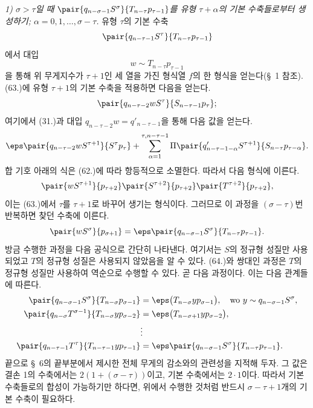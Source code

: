 
\emph{1) $\sigma>\tau$일 때 $\pair{q_{n-\sigma-1}S^\sigma}{T_{n-\tau}p_{\tau-1}}$를 유형 $\tau+\alpha$의 기본 수축들로부터 생성하기; $\alpha=0,1,\ldots,\sigma-\tau$.} 유형 $\tau$의 기본 수축
\[
 \pair{q_{n-\tau-1}S^\tau}{T_{n-\tau}p_{\tau-1}}
\]
에서 대입
\[
 w\sim T_{n-\tau}p_{\tau-1}
\]
을 통해 위 무게지수가 $\tau+1$인 세 열을 가진 형식열 $f$의 한 형식을 얻는다(\S\ 1 참조).
(63.)에 유형 $\tau+1$의 기본 수축을 적용하면 다음을 얻는다.
\[
 \pair{q_{n-\tau-2}wS^\tau}{S_{n-\tau-1}p_\tau};
\]
여기에서 (31.)과 대입 $q_{n-\tau-2}w=q'_{n-\tau-1}$을 통해 다음 값을 얻는다.
\[
 \eps\pair{q_{n-\tau-2}wS^{\tau+1}}{S^\tau p_\tau}
 +\sum_{\alpha=1}^{\tau,n-\tau-1}\Pi\pair{q'_{n-\tau-1-\alpha}S^{\tau+1}}{S_{n-\tau}p_{\tau-\alpha}}.
\]
합 기호 아래의 식은 (62.)에 따라 항등적으로 소멸한다. 따라서 다음 형식에 이른다.
\[
 \pair{wS^{\tau+1}}{p_{\tau+2}}\pair{S^{\tau+2}}{p_{\tau+2}}\pair{T^{\tau+2}}{p_{\tau+2}},
\]
이는 (63.)에서 $\tau$를 $\tau+1$로 바꾸어 생기는 형식이다. 그러므로 이 과정을 $(\sigma-\tau)$번 반복하면 찾던 수축에 이른다.
\[
 \pair{wS^\sigma}{p_{\sigma+1}}=\eps\pair{q_{n-\sigma-1}S^\sigma}{T_{n-\tau}p_{\tau-1}}.
\]
방금 수행한 과정을 다음 공식으로 간단히 나타낸다.
여기서는 $S$의 정규형 성질만 사용되었고 $T$의 정규형 성질은 사용되지 않았음을 알 수 있다. (64.)와 쌍대인 과정은 $T$의 정규형 성질만 사용하여 역순으로 수행할 수 있다. 곧 다음 과정이다.
이는 다음 관계들에 따른다.
\begin{align*}
\pair{q_{n-\sigma-1}S^\sigma}{T_{n-\sigma}p_{\sigma-1}}&=\eps\bigl(T_{n-\sigma}y p_{\sigma-1}\bigr),\quad \text{wo }y\sim q_{n-\sigma-1}S^\sigma,\\
\pair{q_{n-\sigma}T^{\sigma-1}}{T_{n-\sigma}yp_{\sigma-2}}&=\eps\bigl(T_{n-\sigma+1}y p_{\sigma-2}\bigr),\\
&\vdots\\
\pair{q_{n-\tau-1}T^\tau}{T_{n-\tau-1}yp_{\tau-1}}&=\eps\pair{q_{n-\sigma-1}S^\sigma}{T_{n-\tau}p_{\tau-1}}.
\end{align*}
끝으로 \S\ 6의 끝부분에서 제시한 전체 무게의 감소와의 관련성을 지적해 두자. 그 값은 결손 1의 수축에서는 $2(1+(\sigma-\tau))$이고, 기본 수축에서는 $2\cdot1$이다. 따라서 기본 수축들로의 합성이 가능하기만 하다면, 위에서 수행한 것처럼 반드시 $\sigma-\tau+1$개의 기본 수축이 필요하다.
